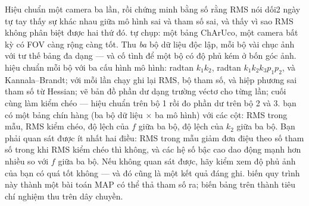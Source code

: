 \documentclass[../../vslam.tex]{subfiles}
\begin{document}
\begin{ungdung}
\end{ungdung}

\begin{duan}{Hiệu chuẩn một camera ba lần, rồi chứng minh bằng số rằng RMS nói dối}{2 ngày}
\dmt tự tay thấy sự khác nhau giữa mô hình sai và tham số sai, và thấy vì sao RMS không phân biệt được hai thứ đó.
\ddl tự chụp: một bảng ChArUco, một camera bất kỳ có FOV càng rộng càng tốt. Thu \emph{ba} bộ dữ liệu độc lập, mỗi bộ vài chục ảnh với tư thế bảng đa dạng --- và cố tình để một bộ có độ phủ kém ở bốn góc ảnh.
\dbc hiệu chuẩn mỗi bộ với ba cấu hình mô hình: radtan \(k_1k_2\), radtan \(k_1k_2k_3p_1p_2\), và Kannala--Brandt; với mỗi lần chạy ghi lại RMS, bộ tham số, và hiệp phương sai tham số từ Hessian; vẽ bản đồ phần dư dạng trường véctơ cho từng lần; cuối cùng làm kiểm chéo --- hiệu chuẩn trên bộ 1 rồi đo phần dư trên bộ 2 và 3.
\dxk bạn có một bảng chín hàng (ba bộ dữ liệu \(\times\) ba mô hình) với các cột: RMS trong mẫu, RMS kiểm chéo, độ lệch của \(f\) giữa ba bộ, độ lệch của \(k_2\) giữa ba bộ. Bạn phải quan sát được ít nhất hai điều: RMS trong mẫu giảm đơn điệu theo số tham số trong khi RMS kiểm chéo thì không, và các hệ số bậc cao dao động mạnh hơn nhiều so với \(f\) giữa ba bộ. Nếu không quan sát được, hãy kiểm xem độ phủ ảnh của bạn có quá tốt không --- và đó cũng là một kết quả đáng ghi.
\dnv {} biến quy trình này thành một bài toán MAP có thể thả tham số ra;  biến bảng trên thành tiêu chí nghiệm thu trên dây chuyền.
\end{duan}
\end{document}
